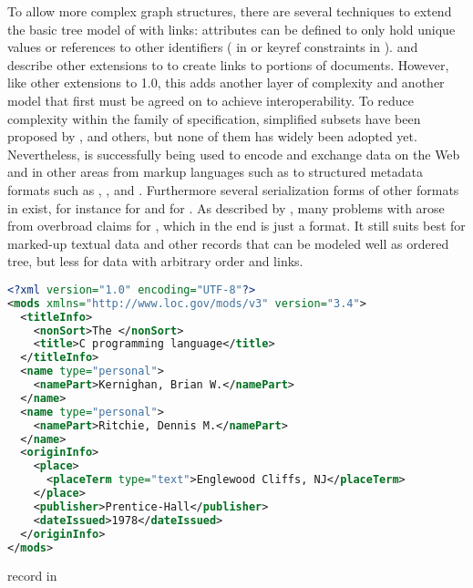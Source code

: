To allow more complex graph structures, there are several techniques to extend
the basic tree model of  with links: attributes can be defined to
only hold unique  values or references to other identifiers
( in  or keyref constraints in ).
 \cite{DeRose2010} and  \cite{Grosso2003} describe
other extensions to  to create links to portions of 
documents. However, like other extensions to  1.0, this adds another
layer of complexity and another model that first must be agreed on to achieve
interoperability. To reduce complexity within the family of 
specification, simplified subsets have been proposed by \textcite{Bray2002},
\textcite{Clark2010} and others, but none of them has widely been adopted yet.
Nevertheless,  is successfully being used to encode and exchange data
on the Web and in other areas from markup languages such as  to
structured metadata formats such as , , and .
Furthermore several serialization forms of other formats in  exist,
for instance  for  and  for .
As described by \textcite{Wilde2008}, many problems with  arose from
overbroad claims for , which in the end is just a format.  It still
suits best for marked-up textual data and other records that can be modeled
well as ordered tree, but less for data with arbitrary order and links.


\begin{example}
\centering
\begin{lstlisting}[language=XML,morekeywords={xmlns}]
<?xml version="1.0" encoding="UTF-8"?>
<mods xmlns="http://www.loc.gov/mods/v3" version="3.4">
  <titleInfo>
    <nonSort>The </nonSort>
    <title>C programming language</title>
  </titleInfo>
  <name type="personal">
    <namePart>Kernighan, Brian W.</namePart>
  </name>
  <name type="personal">
    <namePart>Ritchie, Dennis M.</namePart>
  </name>
  <originInfo>
    <place>
      <placeTerm type="text">Englewood Cliffs, NJ</placeTerm>
    </place>
    <publisher>Prentice-Hall</publisher>
    <dateIssued>1978</dateIssued>
  </originInfo>
</mods>
\end{lstlisting}
\caption{ record in }
\label{ex:xmlmods}
\end{example}


